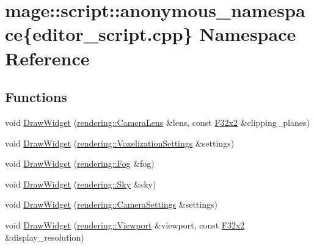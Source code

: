 \hypertarget{namespacemage_1_1script_1_1anonymous__namespace_02editor__script_8cpp_03}{}\section{mage\+:\+:script\+:\+:anonymous\+\_\+namespace\{editor\+\_\+script.\+cpp\} Namespace Reference}
\label{namespacemage_1_1script_1_1anonymous__namespace_02editor__script_8cpp_03}
\subsection*{Functions}
\begin{DoxyCompactItemize}
\item 
void \mbox{\hyperlink{namespacemage_1_1script_1_1anonymous__namespace_02editor__script_8cpp_03_a3ddaba161729b3337a0aef8c3d0dc7af}{Draw\+Widget}} (\mbox{\hyperlink{classmage_1_1rendering_1_1_camera_lens}{rendering\+::\+Camera\+Lens}} \&lens, const \mbox{\hyperlink{namespacemage_aee4759dedc8def6c6dec26b5c7eddf29}{F32x2}} \&clipping\+\_\+planes)
\item 
void \mbox{\hyperlink{namespacemage_1_1script_1_1anonymous__namespace_02editor__script_8cpp_03_a9cadccc3d2af5d50a3909613fa99a378}{Draw\+Widget}} (\mbox{\hyperlink{classmage_1_1rendering_1_1_voxelization_settings}{rendering\+::\+Voxelization\+Settings}} \&settings)
\item 
void \mbox{\hyperlink{namespacemage_1_1script_1_1anonymous__namespace_02editor__script_8cpp_03_a1e931eee19681c54e04ae1d4cdf18a72}{Draw\+Widget}} (\mbox{\hyperlink{classmage_1_1rendering_1_1_fog}{rendering\+::\+Fog}} \&fog)
\item 
void \mbox{\hyperlink{namespacemage_1_1script_1_1anonymous__namespace_02editor__script_8cpp_03_a73c0a74def0eed21038c2cca663ffe51}{Draw\+Widget}} (\mbox{\hyperlink{classmage_1_1rendering_1_1_sky}{rendering\+::\+Sky}} \&sky)
\item 
void \mbox{\hyperlink{namespacemage_1_1script_1_1anonymous__namespace_02editor__script_8cpp_03_ae74de846ef39719a29e31cebc10c091c}{Draw\+Widget}} (\mbox{\hyperlink{classmage_1_1rendering_1_1_camera_settings}{rendering\+::\+Camera\+Settings}} \&settings)
\item 
void \mbox{\hyperlink{namespacemage_1_1script_1_1anonymous__namespace_02editor__script_8cpp_03_a8b34458ebab3e5b7d86daec0cae877f1}{Draw\+Widget}} (\mbox{\hyperlink{classmage_1_1rendering_1_1_viewport}{rendering\+::\+Viewport}} \&viewport, const \mbox{\hyperlink{namespacemage_aee4759dedc8def6c6dec26b5c7eddf29}{F32x2}} \&display\+\_\+resolution)

\end{DoxyCompactItemize}
